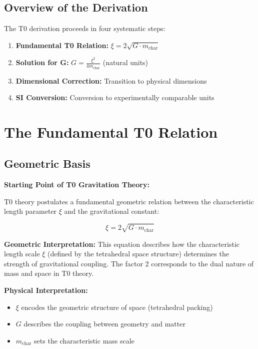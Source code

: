 	\subsection{Overview of the Derivation}
	
	The T0 derivation proceeds in four systematic steps:
	
	\begin{enumerate}
		\item \textbf{Fundamental T0 Relation:} $\xi = 2\sqrt{G \cdot m_{\text{char}}}$
		\item \textbf{Solution for G:} $G = \frac{\xi^2}{4m_{\text{char}}}$ (natural units)
		\item \textbf{Dimensional Correction:} Transition to physical dimensions
		\item \textbf{SI Conversion:} Conversion to experimentally comparable units
	\end{enumerate}
	
	\section{The Fundamental T0 Relation}
	
	\subsection{Geometric Basis}
	
	\begin{derivation}
		\textbf{Starting Point of T0 Gravitation Theory:}
		
		T0 theory postulates a fundamental geometric relation between the characteristic length parameter $\xi$ and the gravitational constant:
		
		\begin{equation}
			\xi = 2\sqrt{G \cdot m_{\text{char}}}
			\label{eq:t0_fundamental}
		\end{equation}
		
		\textbf{Geometric Interpretation:} 
		This equation describes how the characteristic length scale $\xi$ (defined by the tetrahedral space structure) determines the strength of gravitational coupling. The factor 2 corresponds to the dual nature of mass and space in T0 theory.
		
		\textbf{Physical Interpretation:}
		\begin{itemize}
			\item $\xi$ encodes the geometric structure of space (tetrahedral packing)
			\item $G$ describes the coupling between geometry and matter  
			\item $m_{\text{char}}$ sets the characteristic mass scale
		\end{itemize}
	\end{derivation}
	
